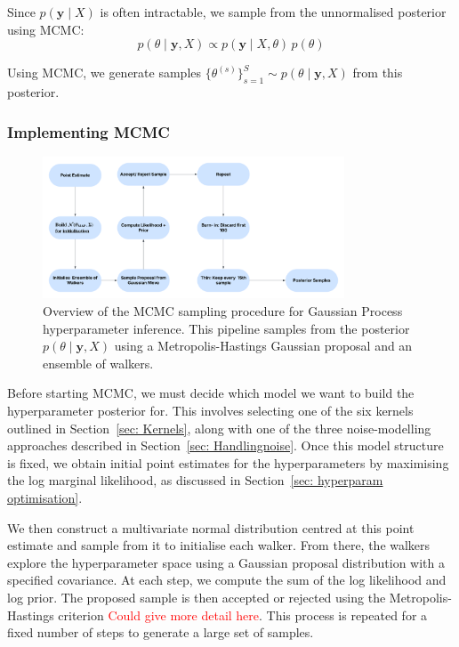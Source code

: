 \documentclass{article}
\begin{document}
\noindent
Since \( p(\mathbf{y} \mid X) \) is often intractable, we sample from the unnormalised posterior using MCMC:
\[
p(\theta \mid \mathbf{y}, X) \propto p(\mathbf{y} \mid X, \theta) \, p(\theta)
\]

\noindent
Using MCMC, we generate samples \( \{\theta^{(s)}\}_{s=1}^S \sim p(\theta \mid \mathbf{y}, X) \) from this posterior.


\subsubsection{Implementing MCMC}
\begin{figure}[H]
    \centering
    \includegraphics[width=0.8\textwidth]{LatexPlots/MCMC Flow.png}
    \caption{Overview of the MCMC sampling procedure for Gaussian Process hyperparameter inference.
     This pipeline samples from the posterior \( p(\theta \mid \mathbf{y}, X) \) using a Metropolis-Hastings Gaussian proposal and an ensemble of walkers.}
    \label{fig:MCMC flowchart}
\end{figure}

\noindent
Before starting MCMC, we must decide which model we want to build the hyperparameter posterior for. This involves selecting one of the six kernels outlined in Section~\ref{sec: Kernels}, along with one of the three noise-modelling approaches described in Section~\ref{sec: Handlingnoise}. Once this model structure is fixed, we obtain initial point estimates for the hyperparameters by maximising the log marginal likelihood, as discussed in Section~\ref{sec: hyperparam optimisation}.

\noindent
We then construct a multivariate normal distribution centred at this point estimate and sample from it to initialise each walker. From there, the walkers explore the hyperparameter space using a Gaussian proposal distribution with a specified covariance. At each step, we compute the sum of the log likelihood and log prior. The proposed sample is then accepted or rejected using the Metropolis-Hastings criterion \textcolor{red}{Could give more detail here}. This process is repeated for a fixed number of steps to generate a large set of samples.
\end{document}
